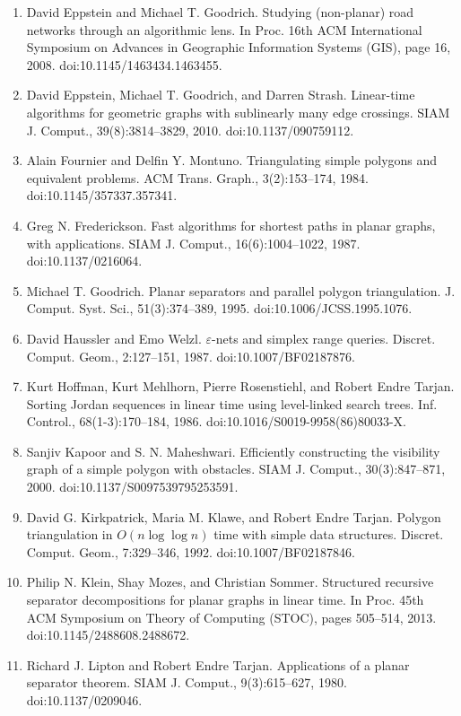 \documentclass[10pt,a4paper]{article}
\begin{document}
\begin{enumerate}
\item[]  [12]  David Eppstein and Michael T. Goodrich.  Studying (non-planar) road networks through an algorithmic lens.  In Proc. 16th ACM International Symposium on Advances in Geographic Information Systems (GIS), page 16, 2008.  doi:10.1145/1463434.1463455.  
\item[]  [13]  David Eppstein, Michael T. Goodrich, and Darren Strash.  Linear-time algorithms for geometric graphs with sublinearly many edge crossings.  SIAM J. Comput., 39(8):3814–3829, 2010.  doi:10.1137/090759112.  
\item[]  [14]  Alain Fournier and Delfin Y. Montuno.  Triangulating simple polygons and equivalent problems.  ACM Trans. Graph., 3(2):153–174, 1984.  doi:10.1145/357337.357341.  
\item[]  [15]  Greg N. Frederickson.  Fast algorithms for shortest paths in planar graphs, with applications.  SIAM J. Comput., 16(6):1004–1022, 1987.  doi:10.1137/0216064.  
\item[]  [16]  Michael T. Goodrich.  Planar separators and parallel polygon triangulation.  J. Comput. Syst. Sci., 51(3):374–389, 1995.  doi:10.1006/JCSS.1995.1076.  
\item[]  [17]  David Haussler and Emo Welzl.  $\varepsilon$-nets and simplex range queries.  Discret. Comput. Geom., 2:127–151, 1987.  doi:10.1007/BF02187876.  
\item[]  [18]  Kurt Hoffman, Kurt Mehlhorn, Pierre Rosenstiehl, and Robert Endre Tarjan.  Sorting Jordan sequences in linear time using level-linked search trees.  Inf. Control., 68(1-3):170–184, 1986.  doi:10.1016/S0019-9958(86)80033-X.  
\item[]  [19]  Sanjiv Kapoor and S. N. Maheshwari.  Efficiently constructing the visibility graph of a simple polygon with obstacles.  SIAM J. Comput., 30(3):847–871, 2000.  doi:10.1137/S0097539795253591.  
\item[]  [20]  David G. Kirkpatrick, Maria M. Klawe, and Robert Endre Tarjan.  Polygon triangulation in $O(n\log\log n)$ time with simple data structures.  Discret. Comput. Geom., 7:329–346, 1992.  doi:10.1007/BF02187846.  
\item[]  [21]  Philip N. Klein, Shay Mozes, and Christian Sommer.  Structured recursive separator decompositions for planar graphs in linear time.  In Proc. 45th ACM Symposium on Theory of Computing (STOC), pages 505–514, 2013.  doi:10.1145/2488608.2488672.  
\item[]  [22]  Richard J. Lipton and Robert Endre Tarjan.  Applications of a planar separator theorem.  SIAM J. Comput., 9(3):615–627, 1980.  doi:10.1137/0209046.  

\end{enumerate}
\end{document}
